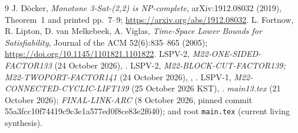 \documentclass[11pt]{article}
\begin{document}
\begin{thebibliography}{9}
 J. D\"ocker, \emph{Monotone 3-Sat-(2,2) is NP-complete}, arXiv:1912.08032 (2019), Theorem~1 and printed pp.~7--9; \url{https://arxiv.org/abs/1912.08032}.
 L. Fortnow, R. Lipton, D. van Melkebeek, A. Viglas, \emph{Time-Space Lower Bounds for Satisfiability}, Journal of the ACM 52(6):835--865 (2005); \url{https://doi.org/10.1145/1101821.1101822}.
 LSPV-2, \emph{M22-ONE-SIDED-FACTOR133} (24 October 2026), .
 LSPV-2, \emph{M22-BLOCK-CUT-FACTOR139; M22-TWOPORT-FACTOR141} (24 October 2026), , .
 LSPV-1, \emph{M22-CONNECTED-CYCLIC-LIFT139} (25 October 2026 KST), .
 \emph{main13.tex} (21 October 2026); \emph{FINAL-LINK-ARC} (8 October 2026, pinned commit 55a3fcc10f74419c9c3e1a577ed0f8ce83e2f640); and root \texttt{main.tex} (current living synthesis).
\end{thebibliography}
\end{document}
